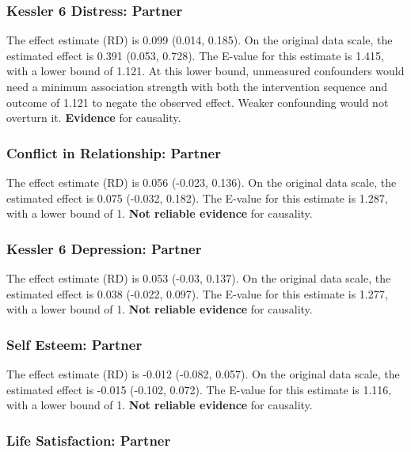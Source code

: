 \documentclass[
  singlecolumn]{article}
\begin{document}
\subsubsection{Kessler 6 Distress:
Partner}\label{kessler-6-distress-partner-9}

The effect estimate (RD) is 0.099 (0.014, 0.185). On the original data
scale, the estimated effect is 0.391 (0.053, 0.728). The E-value for
this estimate is 1.415, with a lower bound of 1.121. At this lower
bound, unmeasured confounders would need a minimum association strength
with both the intervention sequence and outcome of 1.121 to negate the
observed effect. Weaker confounding would not overturn it.
\textbf{Evidence} for causality.

\subsubsection{Conflict in Relationship:
Partner}\label{conflict-in-relationship-partner-9}

The effect estimate (RD) is 0.056 (-0.023, 0.136). On the original data
scale, the estimated effect is 0.075 (-0.032, 0.182). The E-value for
this estimate is 1.287, with a lower bound of 1. \textbf{Not reliable
evidence} for causality.

\subsubsection{Kessler 6 Depression:
Partner}\label{kessler-6-depression-partner-9}

The effect estimate (RD) is 0.053 (-0.03, 0.137). On the original data
scale, the estimated effect is 0.038 (-0.022, 0.097). The E-value for
this estimate is 1.277, with a lower bound of 1. \textbf{Not reliable
evidence} for causality.

\subsubsection{Self Esteem: Partner}\label{self-esteem-partner-9}

The effect estimate (RD) is -0.012 (-0.082, 0.057). On the original data
scale, the estimated effect is -0.015 (-0.102, 0.072). The E-value for
this estimate is 1.116, with a lower bound of 1. \textbf{Not reliable
evidence} for causality.

\subsubsection{Life Satisfaction:
Partner}\label{life-satisfaction-partner-9}
\end{document}
